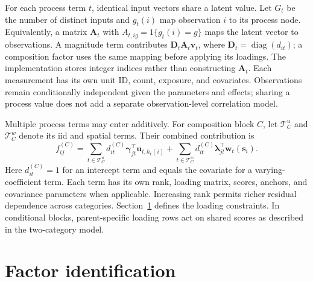 \documentclass[11pt]{article}
\newcommand{\bgamma}{\bm{\gamma}}
\newcommand{\blambda}{\bm{\lambda}}
\newcommand{\bu}{\bm{u}}
\newcommand{\bv}{\bm{v}}
\newcommand{\bw}{\bm{w}}
\newcommand{\bA}{\bm{A}}
\newcommand{\bD}{\bm{D}}
\newcommand{\bs}{\bm{s}}
\newcommand{\trans}{^\top}
\begin{document}
For each process term \(t\), identical input vectors share a latent value.
Let \(G_t\) be the number of distinct inputs and \(g_t(i)\) map observation
\(i\) to its process node. Equivalently, a matrix \(\bA_t\) with
\(A_{t,ig}=1\{g_t(i)=g\}\) maps the latent vector to observations. A
magnitude term contributes \(\bD_t\bA_t\bv_t\), where
\(\bD_t=\operatorname{diag}(d_{it})\); a composition factor uses the same
mapping before applying its loadings. The implementation stores integer
indices rather than constructing \(\bA_t\). Each measurement has its own
unit ID, count, exposure, and covariates. Observations remain conditionally
independent given the parameters and effects; sharing a process value does
not add a separate observation-level correlation model.

Multiple process terms may enter additively. For composition block \(C\),
let \(\mathcal T_C^u\) and \(\mathcal T_C^w\) denote its iid and spatial
terms. Their combined contribution is
\begin{equation}
 f_{ij}^{(C)}=
 \sum_{t\in\mathcal T_C^u}d_{it}^{(C)}\bgamma_{jt}\trans\bu_{t,h_t(i)}
 +\sum_{t\in\mathcal T_C^w}d_{it}^{(C)}\blambda_{jt}\trans\bw_t(\bs_i).
 \label{eq:additive-composition-factor-terms}
\end{equation}
Here \(d_{it}^{(C)}=1\) for an intercept term and equals the covariate for
a varying-coefficient term. Each term has its own rank, loading matrix, scores,
anchors, and covariance parameters when applicable. Increasing rank permits richer
residual dependence across categories. Section~\ref{sec:factor-identification}
defines the loading constraints. In conditional blocks, parent-specific
loading rows act on shared scores as described in the two-category model.

\section{Factor identification}
\label{sec:factor-identification}
\end{document}
